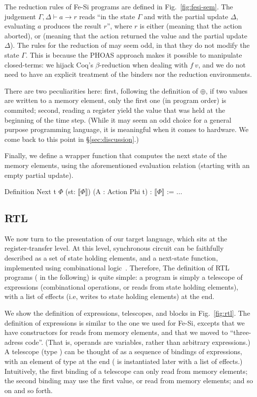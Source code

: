 \documentclass{llncs}
\newcommand{\denote}[1]{\llbracket #1 \rrbracket}
\begin{document}
The reduction rules of Fe-Si programs are defined in
Fig.~\ref{fig:fesi-sem}. The judgement $\Gamma, \Delta \vdash a \to r$
reads ``in the state $\Gamma$ and with the partial update $\Delta$,
evaluating $a$ produces the result $r$'', where $r$ is either
 (meaning that the action aborted), or %
 (meaning that the action returned the value
 and the partial update $\Delta$). 
%
The rules for the reduction of  may seem odd, in that they
do not modify the state $\Gamma$.
%
This is because the PHOAS approach makes it possible to manipulate
closed-terms: we hijack Coq's $\beta$-reduction when dealing with
$f~v$, and we do not need to have an explicit treatment of the binders
nor the reduction environments.

There are two peculiarities here: first, following the definition of
$\oplus$, if two values are written to a memory element, only the
first one (in program order) is commited; second, reading a register
yield the value that was held at the beginning of the time step. 
%
(While it may seem an odd choice for a general purpose programming
language, it is meaningful when it comes to hardware. We come back to
this point in \S\ref{sec:discussion}.)

Finally, we define a wrapper function that computes the next state of
the memory elements, using the aforementioned evaluation relation
(starting with an empty partial update). 
\begin{coq}
Definition Next {t} $\Phi$ (st: $\denote{\Phi}$) (A : Action Phi t) : $\denote{\Phi}$ := ...
\end{coq}

\subsection{RTL} 
We now turn to the presentation of our target language, which sits at
the register-transfer level. At this level, synchronous circuit can be
faithfully described as a set of state holding elements, and a
next-state function, implemented using combinational
logic~\cite{DBLP:journals/cj/Gordon02}.
%
Therefore, The definition of RTL programs ( in the
following) is quite simple: a program is simply a telescope of
expressions (combinational operations, or reads from state holding
elements), with a list of effects (i.e, writes to state holding
elements) at the end. 

We show the definition of expressions, telescopes, and blocks in
Fig.~\ref{fig:rtl}. 
%
The definition of expressions is similar to the one we used for Fe-Si,
excepts that we have constructors for reads from memory elements, and
that we moved to ``three-adress code''.
%
(That is, operands are variables, rather than arbitrary expressions.)
%
A telescope (type ) can be thought of as a sequence of
bindings of expressions, with an element of type  at the
end ( is instantiated later with a list of effects.)
%
Intuitively, the first binding of a telescope can only read from
memory elements; the second binding may use the first value, or read
from memory elements; and so on and so forth.
\end{document}
